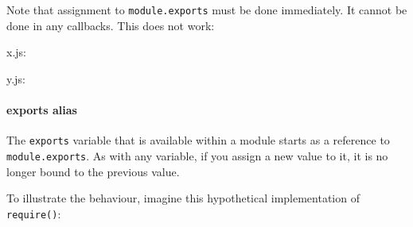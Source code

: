 Note that assignment to \texttt{module.exports} must be done
immediately. It cannot be done in any callbacks. This does not work:

x.js:

\begin{Shaded}
\begin{Highlighting}[]
\NormalTok{(}\NormalTok{() \{}
   \NormalTok{= \{ }\NormalTok{: } \NormalTok{\};}
\NormalTok{\}, }\NormalTok{);}
\end{Highlighting}
\end{Shaded}

y.js:

\begin{Shaded}
\begin{Highlighting}[]
 \NormalTok{(}\NormalTok{);}
\NormalTok{(}\NormalTok{);}
\end{Highlighting}
\end{Shaded}

\paragraph{exports alias}\label{exports-alias}

The \texttt{exports} variable that is available within a module starts
as a reference to \texttt{module.exports}. As with any variable, if you
assign a new value to it, it is no longer bound to the previous value.

To illustrate the behaviour, imagine this hypothetical implementation of
\texttt{require()}:

\begin{Shaded}
\begin{Highlighting}[]
 
   
     
  \NormalTok{);}
   
\NormalTok{\}}
\end{Highlighting}
\end{Shaded}

